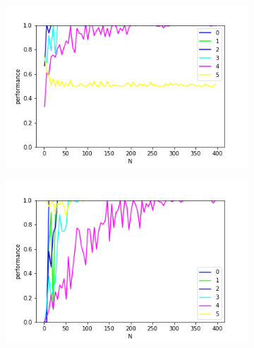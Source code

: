 \documentclass{article}
\begin{document}
\begin{figure}[h]
	\centering
	\begin{subfigure}[t]{0.32\linewidth}
		\centering
		\includegraphics[width = 1.0\linewidth, trim={0 0 0 0}, clip=true]{figures/nplus_heb.png}
	\end{subfigure}%
	\hspace{0.01 \linewidth}
	\begin{subfigure}[t]{0.32\linewidth}
		\centering
		\includegraphics[width = 1.0\linewidth, trim={0 0 0 0}, clip=true]{figures/nplus_perceptron.png}
	\end{subfigure}%
	\hspace{0.01 \linewidth}
	\begin{subfigure}[t]{0.32\linewidth}
		\centering

\end{subfigure}
\end{figure}
\end{document}
